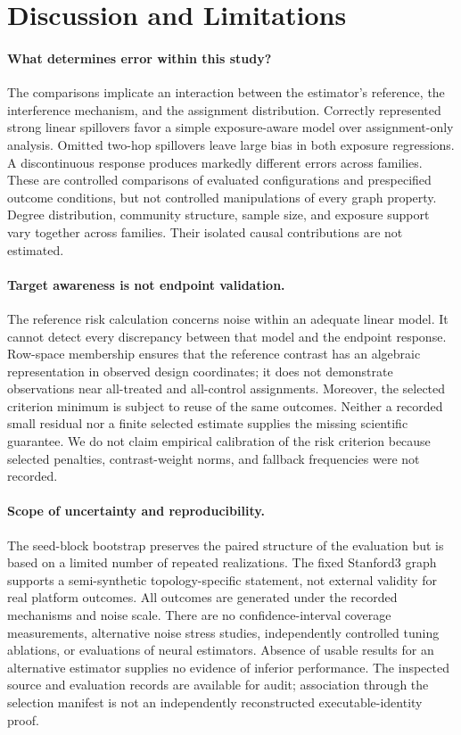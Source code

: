 \documentclass{article}
\begin{document}
\section{Discussion and Limitations}
\paragraph{What determines error within this study?}
The comparisons implicate an interaction between the estimator's reference, the interference mechanism, and the assignment distribution. Correctly represented strong linear spillovers favor a simple exposure-aware model over assignment-only analysis. Omitted two-hop spillovers leave large bias in both exposure regressions. A discontinuous response produces markedly different errors across families. These are controlled comparisons of evaluated configurations and prespecified outcome conditions, but not controlled manipulations of every graph property. Degree distribution, community structure, sample size, and exposure support vary together across families. Their isolated causal contributions are not estimated.

\paragraph{Target awareness is not endpoint validation.}
The reference risk calculation concerns noise within an adequate linear model. It cannot detect every discrepancy between that model and the endpoint response. Row-space membership ensures that the reference contrast has an algebraic representation in observed design coordinates; it does not demonstrate observations near all-treated and all-control assignments. Moreover, the selected criterion minimum is subject to reuse of the same outcomes. Neither a recorded small residual nor a finite selected estimate supplies the missing scientific guarantee. We do not claim empirical calibration of the risk criterion because selected penalties, contrast-weight norms, and fallback frequencies were not recorded.

\paragraph{Scope of uncertainty and reproducibility.}
The seed-block bootstrap preserves the paired structure of the evaluation but is based on a limited number of repeated realizations. The fixed Stanford3 graph supports a semi-synthetic topology-specific statement, not external validity for real platform outcomes. All outcomes are generated under the recorded mechanisms and noise scale. There are no confidence-interval coverage measurements, alternative noise stress studies, independently controlled tuning ablations, or evaluations of neural estimators. Absence of usable results for an alternative estimator supplies no evidence of inferior performance. The inspected source and evaluation records are available for audit; association through the selection manifest is not an independently reconstructed executable-identity proof.
\end{document}
